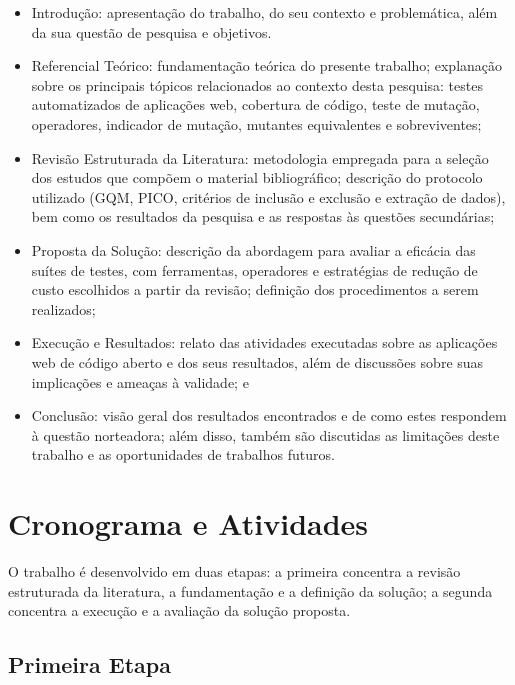 \begin{itemize}
    \item Introdução: apresentação do trabalho, do seu contexto e problemática, além da sua questão de pesquisa e objetivos.
    
    \item Referencial Teórico: fundamentação teórica do presente trabalho; explanação sobre os principais tópicos relacionados ao contexto desta pesquisa: testes automatizados de aplicações web, cobertura de código, teste de mutação, operadores, indicador de mutação, mutantes equivalentes e sobreviventes;
    
    \item Revisão Estruturada da Literatura: metodologia empregada para a seleção dos estudos que compõem o material bibliográfico; descrição do protocolo utilizado (GQM, PICO, critérios de inclusão e exclusão e extração de dados), bem como os resultados da pesquisa e as respostas às questões secundárias;
    
    \item Proposta da Solução: descrição da abordagem para avaliar a eficácia das suítes de testes, com ferramentas, operadores e estratégias de redução de custo escolhidos a partir da revisão; definição dos procedimentos a serem realizados;
    
    \item Execução e Resultados: relato das atividades executadas sobre as aplicações web de código aberto e dos seus resultados, além de discussões sobre suas implicações e ameaças à validade; e
    
    \item Conclusão: visão geral dos resultados encontrados e de como estes respondem à questão norteadora; além disso, também são discutidas as limitações deste trabalho e as oportunidades de trabalhos futuros.
\end{itemize}

\section{Cronograma e Atividades}
\label{sec:secao17}

O trabalho é desenvolvido em duas etapas: a primeira concentra a revisão estruturada da literatura, a fundamentação e a definição da solução; a segunda concentra a execução e a avaliação da solução proposta.

\subsection{Primeira Etapa}


